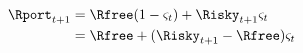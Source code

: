   \begin{equation}\begin{gathered}\begin{aligned}
    \Rport_{t+1}  & = \Rfree(1-\varsigma_{t}) + \Risky_{t+1}\varsigma_{t} \label{eq:return1}
    \\               & = \Rfree + (\Risky_{t+1}-\Rfree) \varsigma_{t} \label{eq:return2}
  \end{aligned}\end{gathered}\end{equation}
